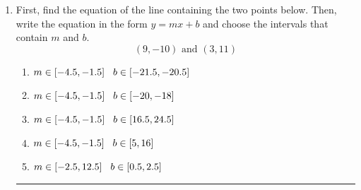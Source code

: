 \documentclass[14pt]{extbook}
\newcommand{\litem}[1]{\item#1\hspace*{-1cm}\rule{\textwidth}{0.4pt}}
\begin{document}
\begin{enumerate}
{\begin{enumerate}[label=\Alph*.]
\end{enumerate} }
\litem{
First, find the equation of the line containing the two points below. Then, write the equation in the form $ y=mx+b $ and choose the intervals that contain $m$ and $b$.\[ (9, -10) \text{ and } (3, 11) \]\begin{enumerate}[label=\Alph*.]
\item \( m \in [-4.5, -1.5] \hspace*{3mm} b \in [-21.5, -20.5] \)
\item \( m \in [-4.5, -1.5] \hspace*{3mm} b \in [-20, -18] \)
\item \( m \in [-4.5, -1.5] \hspace*{3mm} b \in [16.5, 24.5] \)
\item \( m \in [-4.5, -1.5] \hspace*{3mm} b \in [5, 16] \)
\item \( m \in [-2.5, 12.5] \hspace*{3mm} b \in [0.5, 2.5] \)

\end{enumerate} }
\end{enumerate}
\end{document}
